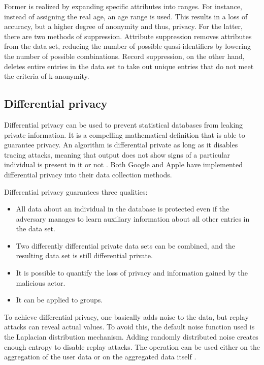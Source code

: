 Former is realized by expanding specific attributes into ranges. For instance, instead of assigning the real age, an age range is used. This results in a loss of accuracy, but a higher degree of anonymity and thus, privacy. For the latter, there are two methods of suppression. Attribute suppression removes attributes from the data set, reducing the number of possible quasi-identifiers by lowering the number of possible combinations. Record suppression, on the other hand, deletes entire entries in the data set to take out unique entries that do not meet the criteria of k-anonymity.

\subsection{Differential privacy}
Differential privacy can be used to prevent statistical databases from leaking private information. It is a compelling mathematical definition that is able to guarantee privacy. An algorithm is differential private as long as it disables tracing attacks, meaning that output does not show signs of a particular individual is present in it or not \cite{DBLP:journals/fttcs/DworkR14}.
Both Google \cite{erlingsson_2014} and Apple \cite{apple} have implemented differential privacy into their data collection methods.

Differential privacy guarantees three qualities:
\begin{itemize}
    \item All data about an individual in the database is protected even if the adversary manages to learn auxiliary information about all other entries in the data set.
    \item Two differently differential private data sets can be combined, and the resulting data set is still differential private.
    \item It is possible to quantify the loss of privacy and information gained by the malicious actor.
    \item It can be applied to groups.
\end{itemize}

To achieve differential privacy, one basically adds noise to the data, but replay attacks can reveal actual values. To avoid this, the default noise function used is the Laplacian distribution mechanism. Adding randomly distributed noise creates enough entropy to disable replay attacks. The operation can be used either on the aggregation of the user data or on the aggregated data itself \cite{DBLP:journals/fttcs/DworkR14}.

